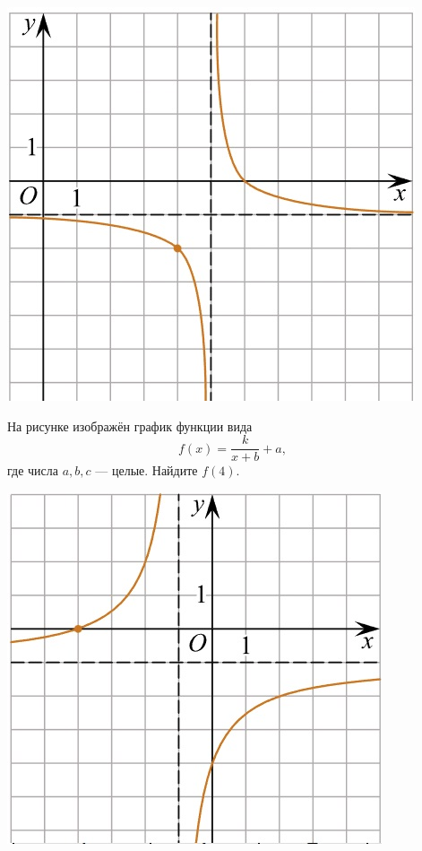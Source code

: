 \begin{class}[number=5]
\begin{listofex}
\begin{minipage}[t]{\picwidth}
			\includegraphics[align=t, width=\linewidth]{pics/G101M4C5-2.jpg}
		\end{minipage}
		\item
		\begin{minipage}[t]{\bodywidth}
			На рисунке изображён график функции вида \[ f(x)=\dfrac{k}{x+b}+a, \] где числа \(a, b, c\) --- целые. Найдите \(f(4)\).
		\end{minipage}
		\hspace{0.05\linewidth}
		\begin{minipage}[t]{\picwidth}
			\includegraphics[align=t, width=\linewidth]{pics/G101M4C5-3.jpg}

\end{minipage}
\end{listofex}
\end{class}
